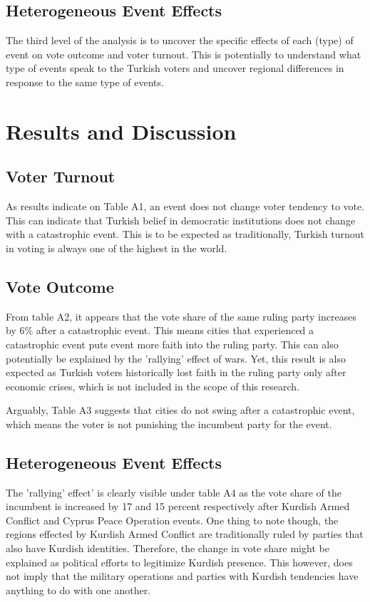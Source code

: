 \documentclass[12pt]{article}
\begin{document}
\subsection{Heterogeneous Event Effects}

The third level of the analysis is to uncover the specific effects of each (type) of event on vote outcome and voter turnout. This is potentially to understand what type of events speak to the Turkish voters and uncover regional differences in response to the same type of events.

\section{Results and Discussion}

\subsection{Voter Turnout}

As results indicate on Table A1, an event does not change voter tendency to vote. This can indicate that Turkish belief in democratic institutions does not change with a catastrophic event. This is to be expected as traditionally, Turkish turnout in voting is always one of the highest in the world.

\subsection{Vote Outcome}

From table A2, it appears that the vote share of the same ruling party increases by 6\% after a catastrophic event. This means cities that experienced a catastrophic event puts event more faith into the ruling party. This can also potentially be explained by the 'rallying' effect of wars. Yet, this result is also expected as Turkish voters historically lost faith in the ruling party only after economic crises, which is not included in the scope of this research. 

Arguably, Table A3 suggests that cities do not swing after a catastrophic event, which means the voter is not punishing the incumbent party for the event. 


\subsection{Heterogeneous Event Effects}

The 'rallying' effect' is clearly visible under table A4 as the vote share of the incumbent is increased by 17 and 15 percent respectively after Kurdish Armed Conflict and Cyprus Peace Operation events. 
One thing to note though, the regions effected by Kurdish Armed Conflict are traditionally ruled by parties that also have Kurdish identities. Therefore, the change in vote share might be explained as political efforts to legitimize Kurdish presence. This however, does not imply that the military operations and parties with Kurdish tendencies have anything to do with one another.  
\end{document}
